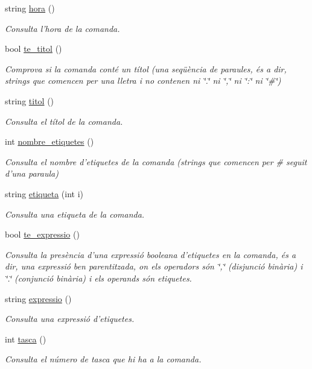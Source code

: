 \begin{DoxyCompactItemize}
string \hyperlink{class_comanda_ae8bca2ad702d3316dc1c53dcab7cac02}{hora} ()
\begin{DoxyCompactList}\small\item\em Consulta l'hora de la comanda. \end{DoxyCompactList}\item 
bool \hyperlink{class_comanda_a5452f5a877d58627cd2bd871cf31b074}{te\-\_\-titol} ()
\begin{DoxyCompactList}\small\item\em Comprova si la comanda conté un títol (una seqüència de paraules, és a dir, strings que comencen per una lletra i no contenen ni \char`\"{}.\char`\"{} ni \char`\"{},\char`\"{} ni \char`\"{}\-:\char`\"{} ni \char`\"{}\#\char`\"{}) \end{DoxyCompactList}\item 
string \hyperlink{class_comanda_ad1cefdda3db389d9ab536a59e2ee907d}{titol} ()
\begin{DoxyCompactList}\small\item\em Consulta el títol de la comanda. \end{DoxyCompactList}\item 
int \hyperlink{class_comanda_a4280b6ae2d435d9c21bbed364cb1db3d}{nombre\-\_\-etiquetes} ()
\begin{DoxyCompactList}\small\item\em Consulta el nombre d'etiquetes de la comanda (strings que comencen per \# seguit d'una paraula) \end{DoxyCompactList}\item 
string \hyperlink{class_comanda_ac80e9a80d16c6bac9a134e431bca1ed0}{etiqueta} (int i)
\begin{DoxyCompactList}\small\item\em Consulta una etiqueta de la comanda. \end{DoxyCompactList}\item 
bool \hyperlink{class_comanda_a81d17f4233e33f3baac7633546c066f0}{te\-\_\-expressio} ()
\begin{DoxyCompactList}\small\item\em Consulta la presència d'una expressió booleana d'etiquetes en la comanda, és a dir, una expressió ben parentitzada, on els operadors són \char`\"{},\char`\"{} (disjunció binària) i \char`\"{}.\char`\"{} (conjunció binària) i els operands són etiquetes. \end{DoxyCompactList}\item 
string \hyperlink{class_comanda_aa3191131592fbf58d20bed1052c31cd1}{expressio} ()
\begin{DoxyCompactList}\small\item\em Consulta una expressió d'etiquetes. \end{DoxyCompactList}\item 
int \hyperlink{class_comanda_a67591051e9c5977c324ad8f8c3ac16e3}{tasca} ()
\begin{DoxyCompactList}\small\item\em Consulta el número de tasca que hi ha a la comanda. \end{DoxyCompactList}\end{DoxyCompactItemize}


